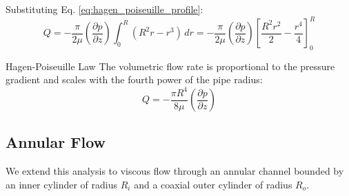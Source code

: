 Substituting Eq. \eqref{eq:hagen_poiseuille_profile}:
\begin{equation}
Q = -\frac{\pi}{2\mu} \left(\frac{\partial p}{\partial z}\right) \int_0^R (R^2 r - r^3) \, dr = -\frac{\pi}{2\mu} \left(\frac{\partial p}{\partial z}\right) \left[ \frac{R^2 r^2}{2} - \frac{r^4}{4} \right]_0^R
\end{equation}

\begin{resultboxnamed}{Hagen-Poiseuille Law}
The volumetric flow rate is proportional to the pressure gradient and scales with the fourth power of the pipe radius:
\begin{equation}
Q = -\frac{\pi R^4}{8\mu} \left(\frac{\partial p}{\partial z}\right)
\end{equation}
\end{resultboxnamed}

\subsection{Annular Flow}

We extend this analysis to viscous flow through an annular channel bounded by an inner cylinder of radius $R_i$ and a coaxial outer cylinder of radius $R_o$.

